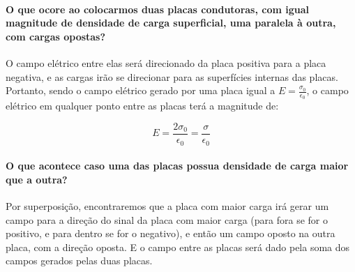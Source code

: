 \begin{multicols*}{2}
  \paragraph{O que ocore ao colocarmos duas placas condutoras, com igual magnitude de densidade de carga superficial, uma paralela à outra, com cargas opostas?} O campo elétrico entre elas será direcionado da placa positiva para a placa negativa, e as cargas irão se direcionar para as superfícies internas das placas. Portanto, sendo o campo elétrico gerado por uma placa igual a $E = \frac{\sigma_0}{\epsilon_0}$, o campo elétrico em qualquer ponto entre as placas terá a magnitude de:

  \[
    E = \frac{2 \sigma_0}{\epsilon_0} = \frac{\sigma}{\epsilon_0}
  \]

  \paragraph{O que acontece caso uma das placas possua densidade de carga maior que a outra?} Por superposição, encontraremos que a placa com maior carga irá gerar um campo para a direção do sinal da placa com maior carga (para fora se for o positivo, e para dentro se for o negativo), e então um campo oposto na outra placa, com a direção oposta. E o campo entre as placas será dado pela soma dos campos gerados pelas duas placas.

\end{multicols*}
